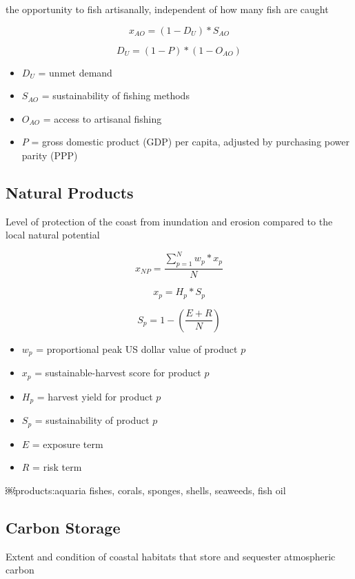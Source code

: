 \documentclass[
]{article}
\begin{document}
the opportunity to fish artisanally, independent of how many fish are
caught

\[
x_{AO} = (1 - D_{U}) * S_{AO}
\]

\[
D_{U} = (1 - P) * (1 - O_{AO})
\]

\begin{itemize}
\item
  \(D_{U}\) = unmet demand
\item
  \(S_{AO}\) = sustainability of fishing methods
\item
  \(O_{AO}\) = access to artisanal fishing
\item
  \(P\) = gross domestic product (GDP) per capita, adjusted by
  purchasing power parity (PPP)
\end{itemize}

\hypertarget{natural-products}{%
\subsection{Natural Products}\label{natural-products}}

Level of protection of the coast from inundation and erosion compared to
the local natural potential

\[
x_{NP} = \frac{\sum_{p=1}^{N} w_p * x_p}{N}  
\]

\[
x_p = H_p * S_p
\]

\[
S_p = 1 - (\frac{E + R}{N})  
\]

\begin{itemize}
\item
  \(w_p\) = proportional peak US dollar value of product \(p\)
\item
  \(x_p\) = sustainable-harvest score for product \(p\)
\item
  \(H_p\) = harvest yield for product \(p\)
\item
  \(S_p\) = sustainability of product \(p\)
\item
  \(E\) = exposure term
\item
  \(R\) = risk term
\end{itemize}

￼products:aquaria fishes, corals, sponges, shells, seaweeds, fish oil

\hypertarget{carbon-storage}{%
\subsection{Carbon Storage}\label{carbon-storage}}

Extent and condition of coastal habitats that store and sequester
atmospheric carbon
\end{document}
